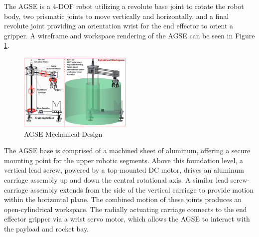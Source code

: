 The AGSE is a 4-DOF robot utilizing a revolute base joint to rotate the robot body, two prismatic joints to move vertically and horizontally, and a final revolute joint providing an orientation wrist for the end effector to orient a gripper. A wireframe and workspace rendering of the AGSE can be seen in Figure \ref{fig:Render}.

\begin{figure}[h]
	\centering
	\includegraphics[width=0.48\textwidth]{figs/AGSE_Mechanical_Design_Figure.png}
	\caption{AGSE Mechanical Design}
	\label{fig:Render}
\end{figure}

The AGSE base is comprised of a machined sheet of aluminum, offering a secure mounting point for the upper robotic segments. Above this foundation level, a vertical lead screw, powered by a top-mounted DC motor, drives an aluminum carriage assembly up and down the central rotational axis. A similar lead screw-carriage assembly extends from the side of the vertical carriage to provide motion within the horizontal plane. The combined motion of these joints produces an open-cylindrical workspace. The radially actuating carriage connects to the end effector gripper via a wrist servo motor, which allows the AGSE to interact with the payload and rocket bay.


 


